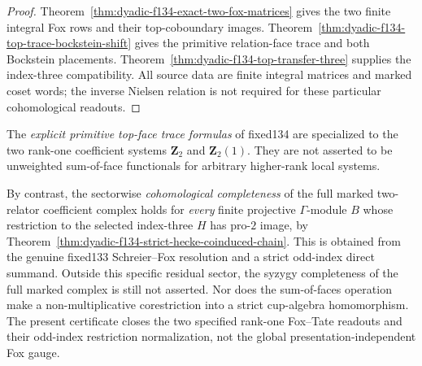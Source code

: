 \begin{proof}
Theorem~\ref{thm:dyadic-f134-exact-two-fox-matrices}
gives the two
finite integral
Fox rows and their
top-coboundary
images.
Theorem~\ref{thm:dyadic-f134-top-trace-bockstein-shift}
gives the primitive
relation-face
trace and both
Bockstein placements.
Theorem~\ref{thm:dyadic-f134-top-transfer-three}
supplies the
index-three
compatibility.
All source data
are finite
integral matrices
and marked
coset words;
the inverse
Nielsen relation
is not required
for these
particular
cohomological
readouts.
\end{proof}

\begin{warning}
\label{warn:dyadic-f134-rankone-trace-scope}
The \emph{explicit
primitive top-face
trace formulas}
of fixed134
are specialized
to the two
rank-one
coefficient
systems
$\mathbf Z_2$
and
$\mathbf Z_2(1)$.
They are not
asserted to
be unweighted
sum-of-face
functionals
for arbitrary
higher-rank
local systems.

By contrast,
the sectorwise
\emph{cohomological
completeness}
of the full
marked
two-relator
coefficient
complex holds
for \emph{every}
finite projective
$\Gamma$-module
$B$ whose
restriction to
the selected
index-three
$H$ has
pro-$2$ image,
by
Theorem~\ref{thm:dyadic-f134-strict-hecke-coinduced-chain}.
This is obtained
from the
genuine fixed133
Schreier--Fox
resolution and
a strict
odd-index
direct summand.
Outside this
specific residual
sector, the
syzygy completeness
of the full
marked complex
is still not
asserted.
Nor does the
sum-of-faces
operation
make a
non-multiplicative
corestriction
into a
strict
cup-algebra
homomorphism.
The present
certificate
closes the
two specified
rank-one
Fox--Tate
readouts
and their
odd-index
restriction
normalization,
not the
global
presentation-independent
Fox gauge.
\end{warning}
